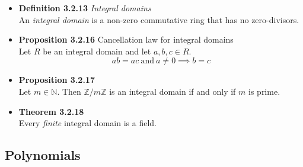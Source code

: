 \documentclass[11pt,a4paper]{article}
\begin{document}
\begin{itemize}
    \item \textbf{Definition 3.2.13} \emph{Integral domains} \\
        An \emph{integral domain} is a non-zero commutative ring that has no zero-divisors.

    \item \textbf{Proposition 3.2.16} Cancellation law for integral domains \\
        Let $R$ be an integral domain and let $a,b,c \in R$.
        \[
            ab = ac \ \text{and} \ a \neq 0 \implies b = c
        \]

    \item \textbf{Proposition 3.2.17} \\
        Let $m \in \mathbb{N}$.
        Then $\mathbb{Z}/m\mathbb{Z}$ is an integral domain if and only if $m$ is prime.

    \item \textbf{Theorem 3.2.18} \\
        Every \emph{finite} integral domain is a field.
\end{itemize}

\subsection{Polynomials}
\end{document}
